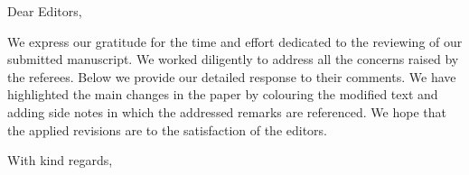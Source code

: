 \noindent
Dear Editors,

\vspace{2em}

We express our gratitude for the time and effort dedicated to the reviewing of our submitted manuscript. We worked diligently to address all the concerns raised by the referees. Below we provide our detailed response to their comments.
We have highlighted the main changes in the paper by colouring the modified text and adding side notes in which the addressed remarks are referenced.
We hope that the applied revisions are to the satisfaction of the editors.

\vspace{2em}

With kind regards,
\begin{flushright}
	\AuthorsInSignature
\end{flushright}


